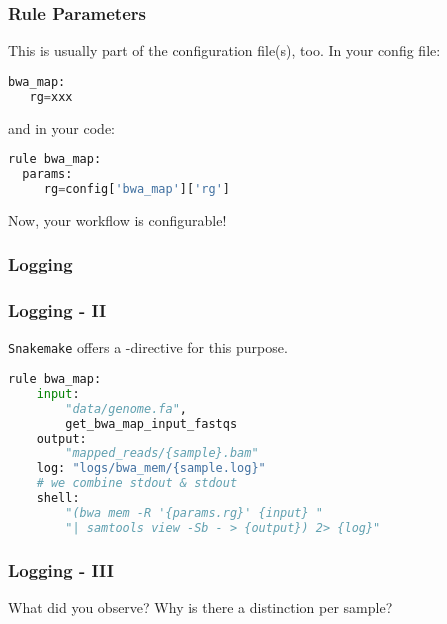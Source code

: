 \begin{frame}[fragile]
  \frametitle{Rule Parameters}
  This is usually part of the configuration file(s), too.\newline
  In your config file:
  \begin{lstlisting}[language=Python,style=Python]
bwa_map:
   rg=xxx
  \end{lstlisting}
  and in your code:
  \begin{lstlisting}[language=Python,style=Python]
rule bwa_map:
  params:
     rg=config['bwa_map']['rg']
  \end{lstlisting}
  Now, your workflow is configurable!
\end{frame}

\begin{frame}[fragile]
  \frametitle{Logging}
  \pause
  \pause
\end{frame}

\begin{frame}[fragile]
  \frametitle{Logging - II}
  \texttt{Snakemake} offers a -directive for this purpose.  
  \begin{lstlisting}[language=Python,style=Python]
rule bwa_map:
    input:
        "data/genome.fa",
        get_bwa_map_input_fastqs
    output:
        "mapped_reads/{sample}.bam"
    log: "logs/bwa_mem/{sample.log}"
    # we combine stdout & stdout
    shell:
        "(bwa mem -R '{params.rg}' {input} "
        "| samtools view -Sb - > {output}) 2> {log}"
   \end{lstlisting}
\end{frame}

\begin{frame}
  \frametitle{Logging - III}
  \begin{question}[Questions]
  	 What did you observe? Why is there a distinction per sample?
  \end{question}
  \pause
\end{frame}

